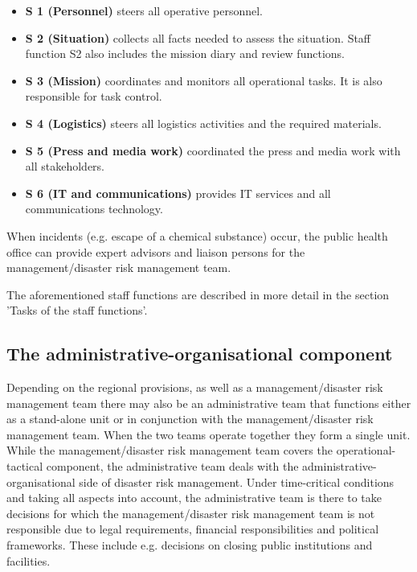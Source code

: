 \documentclass{article}
\begin{document}
\begin{itemize}
\item \textbf{S 1 (Personnel)} steers all operative personnel.


\item \textbf{S 2 (Situation) }collects all facts needed to assess the\textbf{ }situation. Staff function S2 also includes the mission diary and review functions.


\item \textbf{S 3 (Mission) }coordinates and monitors all operational tasks.\textbf{ }It is also responsible for task control.


\item \textbf{S 4 (Logistics) }steers all logistics activities and the required materials.


\item \textbf{S 5 (Press and media work) }coordinated the press and media work with all\textbf{ }stakeholders.


\item \textbf{S 6 (IT and communications) }provides IT services and all communications\textbf{ }technology.


\end{itemize}

When incidents (e.g. escape of a chemical substance) occur, the public health office can provide expert advisors and liaison persons for the management/disaster risk management team.


The aforementioned staff functions are described in more detail in the section 'Tasks of the staff functions'.


\subsection{The administrative-organisational component}\label{H9624826}



Depending on the regional provisions, as well as a management/disaster risk management team there may also be an administrative team that functions either as a stand-alone unit or in conjunction with the management/disaster risk management team. When the two teams operate together they form a single unit. While the management/disaster risk management team covers the operational-tactical component, the administrative team deals with the administrative-organisational side of disaster risk management. Under time-critical conditions and taking all aspects into account, the administrative team is there to take decisions for which the management/disaster risk management team is not responsible due to legal requirements, financial responsibilities and political frameworks. These include e.g. decisions on closing public institutions and facilities.
\end{document}
